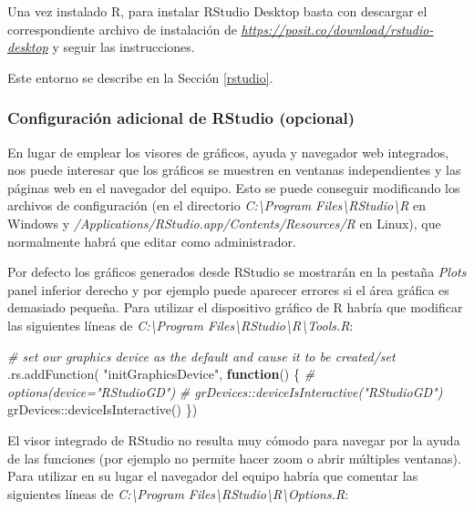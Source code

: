 \documentclass[
]{book}
\newenvironment{Shaded}{\begin{snugshade}}{\end{snugshade}}
\newcommand{\CommentTok}[1]{\textcolor[rgb]{0.56,0.35,0.01}{\textit{#1}}}
\newcommand{\ControlFlowTok}[1]{\textcolor[rgb]{0.13,0.29,0.53}{\textbf{#1}}}
\newcommand{\FunctionTok}[1]{\textcolor[rgb]{0.00,0.00,0.00}{#1}}
\newcommand{\NormalTok}[1]{#1}
\newcommand{\SpecialCharTok}[1]{\textcolor[rgb]{0.00,0.00,0.00}{#1}}
\newcommand{\StringTok}[1]{\textcolor[rgb]{0.31,0.60,0.02}{#1}}
\theoremstyle{break}
\theoremstyle{nonumberplain}
\begin{document}
Una vez instalado R, para instalar RStudio Desktop basta con descargar el correspondiente archivo de instalación de \href{https://posit.co/download/rstudio-desktop}{\emph{https://posit.co/download/rstudio-desktop}} y seguir las instrucciones.

Este entorno se describe en la Sección \ref{rstudio}.

\hypertarget{op-rstudio-win}{%
\subsubsection{Configuración adicional de RStudio (opcional)}\label{op-rstudio-win}}

En lugar de emplear los visores de gráficos, ayuda y navegador web integrados, nos puede interesar que los gráficos se muestren en ventanas independientes y las páginas web en el navegador del equipo.
Esto se puede conseguir modificando los archivos de configuración (en el directorio \emph{C:\textbackslash Program Files\textbackslash RStudio\textbackslash R} en Windows y \emph{/Applications/RStudio.app/Contents/Resources/R} en Linux), que normalmente habrá que editar como administrador.

Por defecto los gráficos generados desde RStudio se mostrarán en la pestaña \emph{Plots} panel inferior derecho y por ejemplo puede aparecer errores si el área gráfica es demasiado pequeña.
Para utilizar el dispositivo gráfico de R habría que modificar las siguientes líneas de \emph{C:\textbackslash Program Files\textbackslash RStudio\textbackslash R\textbackslash Tools.R}:

\begin{Shaded}
\begin{Highlighting}[]
\CommentTok{\# set our graphics device as the default and cause it to be created/set}
\FunctionTok{.rs.addFunction}\NormalTok{( }\StringTok{"initGraphicsDevice"}\NormalTok{, }\ControlFlowTok{function}\NormalTok{()}
\NormalTok{\{}
   \CommentTok{\# options(device="RStudioGD")}
   \CommentTok{\# grDevices::deviceIsInteractive("RStudioGD")}
\NormalTok{  grDevices}\SpecialCharTok{::}\FunctionTok{deviceIsInteractive}\NormalTok{()}
\NormalTok{\})}
\end{Highlighting}
\end{Shaded}

El visor integrado de RStudio no resulta muy cómodo para navegar por la ayuda de las funciones (por ejemplo no permite hacer zoom o abrir múltiples ventanas).
Para utilizar en su lugar el navegador del equipo habría que comentar las siguientes líneas de \emph{C:\textbackslash Program Files\textbackslash RStudio\textbackslash R\textbackslash Options.R}:
\end{document}
